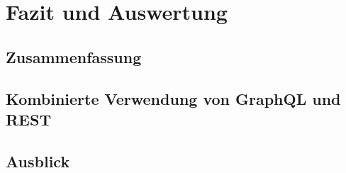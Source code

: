 \section{Fazit und Auswertung}

\subsection{Zusammenfassung}

\subsection{Kombinierte Verwendung von GraphQL und REST}

\subsection{Ausblick}
